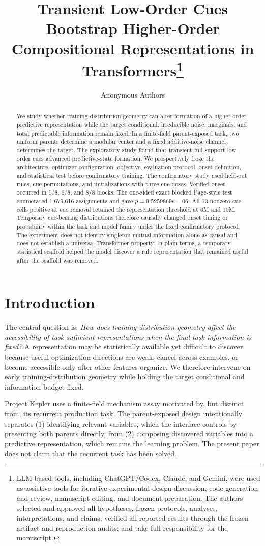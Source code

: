 \documentclass[10pt]{article}
\title{Transient Low-Order Cues Bootstrap Higher-Order Compositional
Representations in Transformers\thanks{LLM-based tools, including ChatGPT/Codex, Claude, and Gemini, were used as assistive tools for iterative experimental-design discussion, code generation and review, manuscript editing, and document preparation. The authors selected and approved all hypotheses, frozen protocols, analyses, interpretations, and claims; verified all reported results through the frozen artifact and reproduction audits; and take full responsibility for the manuscript.}}
\author{\name Anonymous Authors}
\begin{document}
\maketitle


\begin{abstract}
We study whether training-distribution geometry can alter formation of a
higher-order predictive representation while the target conditional,
irreducible noise, marginals, and total predictable information remain fixed.
In a finite-field parent-exposed task, two uniform parents determine a modular
center and a fixed additive-noise channel determines the target. The
exploratory study found that transient full-support low-order cues advanced
predictive-state formation. We prospectively froze the architecture,
optimizer configuration, objective, evaluation protocol, onset definition,
and statistical test before confirmatory training. The confirmatory study used
held-out rules, cue permutations, and initializations with three cue doses.
Verified onset occurred in 1/8,
6/8, and 8/8 blocks. The
one-sided exact blocked Page-style test enumerated
1,679,616 assignments and gave
$p=9.5259869e-06$. All 13 nonzero-cue cells
positive at cue removal retained the representation threshold at 6M and 10M.
Temporary cue-bearing distributions therefore causally changed onset timing or
probability within the task and model family under the fixed confirmatory
protocol. The experiment does not
identify singleton mutual information alone as causal and does not establish a
universal Transformer property. In plain terms, a temporary statistical
scaffold helped the model discover a rule representation that remained useful
after the scaffold was removed.
\end{abstract}

\section{Introduction}
The central question is: \emph{How does training-distribution geometry affect
the accessibility of task-sufficient representations when the final task
information is fixed?} A representation may be statistically available yet
difficult to discover because useful optimization directions are weak, cancel
across examples, or become accessible only after other features organize. We
therefore intervene on early training-distribution geometry while holding the
target conditional and information budget fixed.

Project Kepler uses a finite-field mechanism assay motivated by, but distinct
from, its recurrent production task. The parent-exposed design intentionally
separates (1) identifying relevant variables, which the interface controls by
presenting both parents directly, from (2) composing discovered variables into
a predictive representation, which remains the learning problem. The present
paper does not claim that the recurrent task has been solved.
\end{document}
